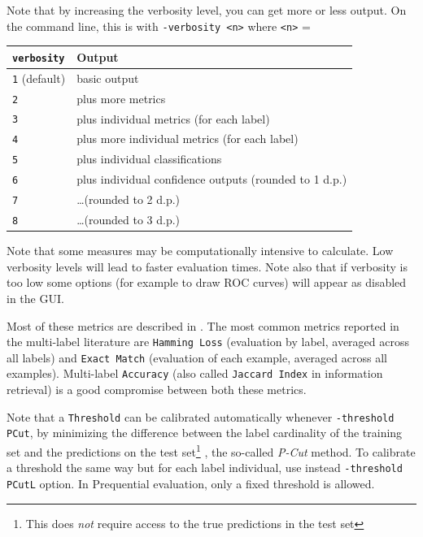 \documentclass[11pt]{article}
\begin{document}
Note that by increasing the verbosity level, you can get more or less output. On the command line, this is with \texttt{-verbosity <n>} where \texttt{<n>} = 
\begin{center}
\begin{tabular}{ll}
	\hline
	\texttt{verbosity}       & Output \\
	\hline
	\texttt{1} (default) & basic output \\
	\texttt{2}           & plus more metrics \\
	\texttt{3}           & plus individual metrics (for each label) \\
	\texttt{4}           & plus more individual metrics (for each label) \\
	\texttt{5}           & plus individual classifications \\
	\texttt{6}           & plus individual confidence outputs (rounded to 1 d.p.) \\
	\texttt{7}           & \ldots (rounded to 2 d.p.) \\
	\texttt{8}           & \ldots (rounded to 3 d.p.) \\
	\hline
\end{tabular}
\end{center}
Note that some measures may be computationally intensive to calculate. Low verbosity levels will lead to faster evaluation times. Note also that if verbosity is too low some options (for example to draw ROC curves) will appear as disabled in the GUI.

Most of these metrics are described in \cite{ECC2,MMD}. The most common metrics reported in the multi-label literature are \texttt{Hamming Loss} (evaluation by label, averaged across all labels) and \texttt{Exact Match} (evaluation of each example, averaged across all examples). Multi-label \texttt{Accuracy} (also called \texttt{Jaccard Index} in information retrieval) is a good compromise between both these metrics.


Note that a \texttt{Threshold} can be calibrated automatically whenever \texttt{-threshold PCut}, by minimizing the difference between the label cardinality of the training set and the predictions on the test set\footnote{This does \emph{not} require access to the true predictions in the test set} \cite{ECC2}, the so-called \textit{P-Cut} method. To calibrate a threshold the same way but for each label individual, use instead \texttt{-threshold PCutL} option. In \textsf{Prequential} evaluation, only a fixed threshold is allowed.
\end{document}
